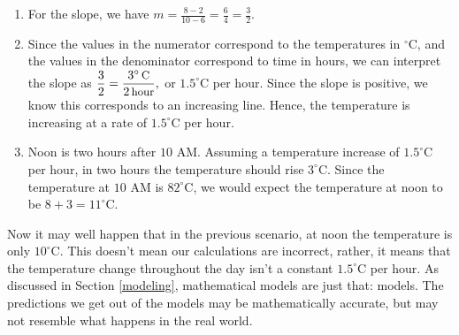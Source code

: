 {
\begin{enumerate}

\item For the slope, we have  $m = \frac{8 - 2}{10 - 6} = \frac{6}{4} = \frac{3}{2}$.  

\item  Since the values in the numerator correspond to the temperatures in $^{\circ}$C, and the values in the denominator correspond to time in hours, we can interpret the slope as $\dfrac{3}{2} = \dfrac{3^{\circ} \, \mbox{\small C}}{2 \, \mbox{\small hour}},$ or $1.5^{\circ}$C per hour.  Since the slope is positive, we know this corresponds to an increasing line.  Hence, the temperature is increasing at a rate of $1.5^{\circ}$C per hour.

\item  Noon is two hours after $10$ AM.  Assuming a temperature increase of $1.5^{\circ}$C per hour, in two hours the temperature should rise $3^{\circ}$C.  Since the temperature at $10$ AM is $82^{\circ}$C, we would expect the temperature at noon to be $8+3=11^{\circ}$C.
\end{enumerate}
}

\medskip

Now it may well happen that in the previous scenario, at noon the temperature is only $10^{\circ}$C.  This doesn't mean our calculations are incorrect, rather, it means that the temperature change throughout the day isn't a constant $1.5^{\circ}$C per hour. As discussed in Section \ref{modeling}, mathematical models are just that:  models.  The predictions we get out of the models may be mathematically accurate, but may not resemble what happens in the real world. 


